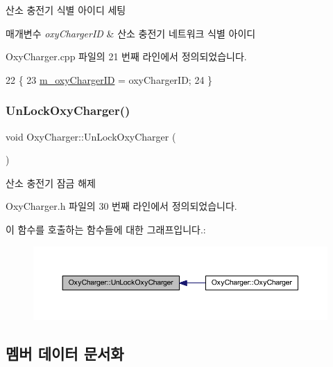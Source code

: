 산소 충전기 식별 아이디 세팅 


\begin{DoxyParams}{매개변수}
{\em oxy\+Charger\+ID} & 산소 충전기 네트워크 식별 아이디 \\
\hline
\end{DoxyParams}


Oxy\+Charger.\+cpp 파일의 21 번째 라인에서 정의되었습니다.


\begin{DoxyCode}
22 \{
23     \hyperlink{class_oxy_charger_a7229fb2e4423cad1f648bd710ee8d092}{m\_oxyChargerID} = oxyChargerID;
24 \}
\end{DoxyCode}
\mbox{\label{class_oxy_charger_abe01eac96e95d7a667d782829abd51dd}} 
\subsubsection{\texorpdfstring{Un\+Lock\+Oxy\+Charger()}{UnLockOxyCharger()}}
{\footnotesize\ttfamily void Oxy\+Charger\+::\+Un\+Lock\+Oxy\+Charger (\begin{DoxyParamCaption}{ }\end{DoxyParamCaption})\hspace{0.3cm}{\ttfamily [inline]}}



산소 충전기 잠금 해제 



Oxy\+Charger.\+h 파일의 30 번째 라인에서 정의되었습니다.

이 함수를 호출하는 함수들에 대한 그래프입니다.\+:\nopagebreak
\begin{figure}[H]
\begin{center}
\leavevmode
\includegraphics[width=350pt]{class_oxy_charger_abe01eac96e95d7a667d782829abd51dd_icgraph}
\end{center}
\end{figure}


\subsection{멤버 데이터 문서화}
\mbox{\label{class_oxy_charger_af976be20b7f8cd8cf9c6f59857ba2f48}} 
